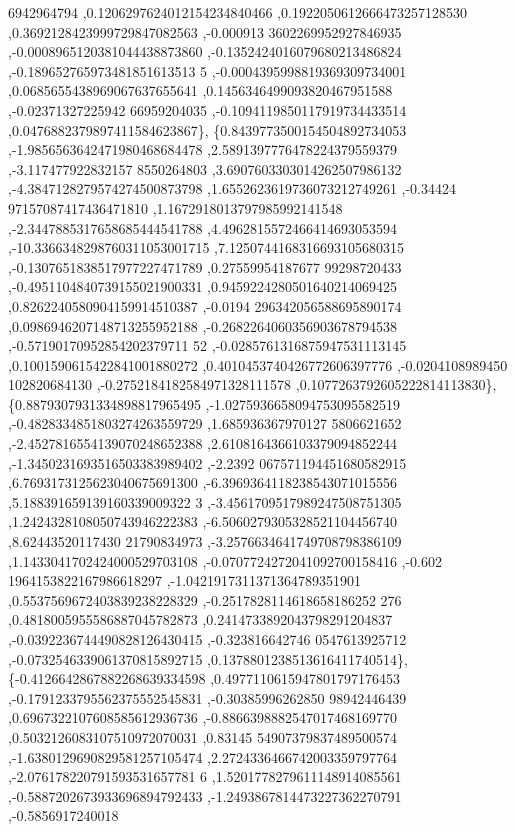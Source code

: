 \begin{DoxyCode}
      6942964794 ,0.1206297624012154234840466 ,0.1922050612666473257128530 ,0.3692128423999729847082563 ,-0.000913
      3602269952927846935 ,-0.0008965120381044438873860 ,-0.1352424016079680213486824 ,-0.189652765973481851613513
      5 ,-0.0004395998819369309734001 ,0.0685655438969067637655641 ,0.1456346499093820467951588 ,-0.02371327225942
      66959204035 ,-0.1094119850117919734433514 ,0.0476882379897411584623867\},
\{0.8439773500154504892734053 ,-1.9856563642471980468684478 ,2.5891397776478224379559379 ,-3.117477922832157
      8550264803 ,3.6907603303014262507986132 ,-4.3847128279574274500873798 ,1.6552623619736073212749261 ,-0.34424
      97157087417436471810 ,1.1672918013797985992141548 ,-2.3447885317658685444541788 ,4.4962815572466414693053594
       ,-10.3366348298760311053001715 ,7.1250744168316693105680315 ,-0.1307651838517977227471789 ,0.27559954187677
      99298720433 ,-0.4951104840739155021900331 ,0.9459224280501640214069425 ,0.8262240580904159914510387 ,-0.0194
      296342056588695890174 ,0.0986946207148713255952188 ,-0.2682264060356903678794538 ,-0.57190170952854202379711
      52 ,-0.0285761316875947531113145 ,0.1001590615422841001880272 ,0.4010453740426772606397776 ,-0.0204108989450
      102820684130 ,-0.2752184182584971328111578 ,0.1077263792605222814113830\},
\{0.8879307931334898817965495 ,-1.0275936658094753095582519 ,-0.4828334851803274263559729 ,1.685936367970127
      5806621652 ,-2.4527816554139070248652388 ,2.6108164366103379094852244 ,-1.3450231693516503383989402 ,-2.2392
      067571194451680582915 ,6.7693173125623040675691300 ,-6.3969364118238543071015556 ,5.188391659139160339009322
      3 ,-3.4561709517989247508751305 ,1.2424328108050743946222383 ,-6.5060279305328521104456740 ,8.62443520117430
      21790834973 ,-3.2576634641749708798386109 ,1.1433041702424000529703108 ,-0.0707724272041092700158416 ,-0.602
      1964153822167986618297 ,-1.0421917311371364789351901 ,0.5537569672403839238228329 ,-0.2517828114618658186252
      276 ,0.4818005955586887045782873 ,0.2414733892043798291204837 ,-0.0392236744490828126430415 ,-0.323816642746
      0547613925712 ,-0.0732546339061370815892715 ,0.1378801238513616411740514\},
\{-0.4126642867882268639334598 ,0.4977110615947801797176453 ,-0.1791233795562375552545831 ,-0.30385996262850
      98942446439 ,0.6967322107608585612936736 ,-0.8866398882547017468169770 ,0.5032126083107510972070031 ,0.83145
      54907379837489500574 ,-1.6380129690829581257105474 ,2.2724336466742003359797764 ,-2.076178220791593531657781
      6 ,1.5201778279611148914085561 ,-0.5887202673933696894792433 ,-1.2493867814473227362270791 ,-0.5856917240018

\end{DoxyCode}
